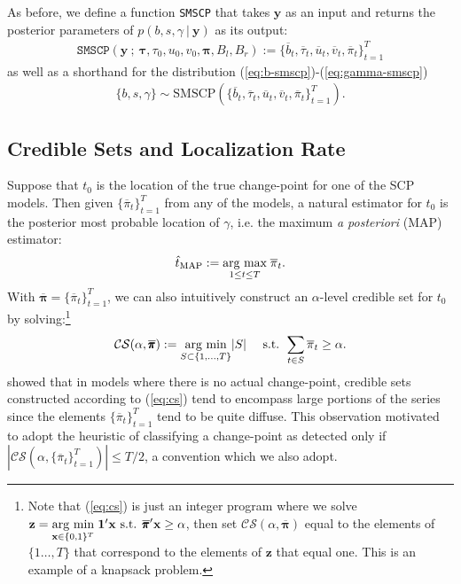 As before, we define a function \texttt{SMSCP} that takes $\mathbf{y}$ as an input and returns the posterior parameters of $p(b, s, \gamma\:|\:\mathbf{y})$ as its output:
\begin{align}
    \texttt{SMSCP}\left(\mathbf{y} \:;\: \pmb{\tau}, \tau_0, u_0, v_0, \pmb{\pi}, B_l, B_r\right) := \{\overline{b}_t, \overline{\tau}_t, \overline{u}_t, \overline{v}_t, \overline{\pi}_t\}_{t=1}^T
\end{align}
as well as a shorthand for the distribution (\ref{eq:b-smscp})-(\ref{eq:gamma-smscp})
\begin{align}
    \{b,s,\gamma\}\sim\text{SMSCP}(\{\overline{b}_t, \overline{\tau}_t, \overline{u}_t, \overline{v}_t, \overline{\pi}_t\}_{t=1}^T).
\end{align}

\subsection{Credible Sets and Localization Rate}
\label{sec:localization}

Suppose that $t_0$ is the location of the true change-point for one of the SCP models. Then given $\{\overline{\pi}_t\}_{t=1}^T$ from any of the models, a natural estimator for $t_0$ is the posterior most probable location of $\gamma$, i.e. the maximum \textit{a posteriori} (MAP) estimator:
\begin{align}\label{eq:map}
    \hat{t}_{\text{MAP}} := \underset{1 \leq t \leq T}{\text{arg max}} \; \overline{\pi}_t.
\end{align}
With $\overline{\pmb{\pi}} = \{\overline{\pi}_t\}_{t=1}^T$, we can also intuitively construct an $\alpha$-level credible set for $t_0$ by solving:\footnote{Note that (\ref{eq:cs}) is just an integer program where we solve $\mathbf{z} = \underset{\mathbf{x}\in\{0,1\}^T}{\text{arg min}} \; \mathbf{1}'\mathbf{x} \text{ s.t. } \overline{\pmb{\pi}}'\mathbf{x} \geq \alpha$, then set $\mathcal{CS}(\alpha, \overline{\pmb{\pi}})$ equal to the elements of $\{1\ldots,T\}$ that correspond to the elements of $\mathbf{z}$ that equal one. This is an example of a knapsack problem.}
\begin{align}\label{eq:cs}
    \mathcal{CS}(\alpha, \overline{\pmb{\pi}}) := \underset{S \subset \{1,\ldots,T\}}{\text{arg min}} |S| \quad\text{ s.t. } \sum_{t \in S} \overline{\pi}_t \geq \alpha.
\end{align}
\cite{Cappello22} showed that in models where there is no actual change-point, credible sets constructed according to (\ref{eq:cs}) tend to encompass large portions of the series since the elements $\{\overline{\pi}_t\}_{t=1}^T$ tend to be quite diffuse. This observation motivated \cite{Cappello22} to adopt the heuristic of classifying a change-point as detected only if $|\mathcal{CS}(\alpha, \{\overline{\pi}_t\}_{t=1}^T)| \leq T/2$, a convention which we also adopt.

